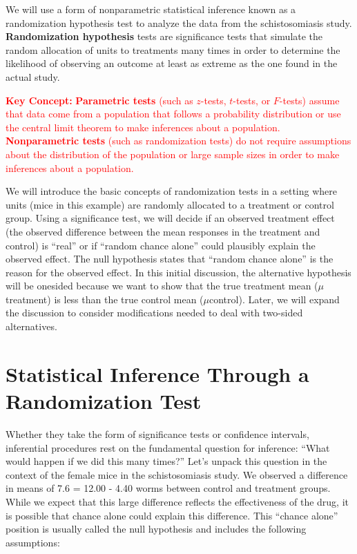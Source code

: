 \documentclass[
]{report}
\begin{document}
\normalsize

We will use a form of nonparametric statistical inference known as a randomization hypothesis test to analyze the data from the schistosomiasis study. \textbf{Randomization hypothesis} tests are significance tests that simulate the random allocation of units to treatments many times in order to determine the likelihood of observing an outcome at least as extreme as the one found in the actual study.

\Large

\textbf{\textcolor{red}{Key Concept:}}
\textcolor{red}{\textbf{Parametric tests} (such as $z$-tests, $t$-tests, or $F$-tests) assume that data come from a population that follows a probability distribution or use the central limit theorem to make inferences about a population. \textbf{Nonparametric tests} (such as randomization tests) do not require assumptions about the distribution of the population or large sample sizes in order to make inferences about a population.}

\normalsize

We will introduce the basic concepts of randomization tests in a setting where units (mice in this example) are randomly allocated to a treatment or control group. Using a significance test, we will decide if an observed treatment effect (the observed difference between the mean responses in the treatment and control) is ``real'' or if ``random chance alone'' could plausibly explain the observed effect. The null hypothesis states that ``random chance alone'' is the reason for the observed effect. In this initial discussion, the alternative hypothesis will be onesided because we want to show that the true treatment mean (\(\mu\)treatment) is less than the true control mean (\(\mu\)control). Later, we will expand the discussion to consider modifications needed to deal with two-sided alternatives.

\section{\texorpdfstring{\textbf{Statistical Inference Through a Randomization Test}}{Statistical Inference Through a Randomization Test}}\label{statistical-inference-through-a-randomization-test}

Whether they take the form of significance tests or confidence intervals, inferential procedures rest on the fundamental question for inference: ``What would happen if we did this many times?'' Let's unpack this
question in the context of the female mice in the schistosomiasis study. We observed a difference in means
of 7.6 = 12.00 - 4.40 worms between control and treatment groups. While we expect that this large difference
reflects the effectiveness of the drug, it is possible that chance alone could explain this difference. This
``chance alone'' position is usually called the null hypothesis and includes the following assumptions:
\end{document}
